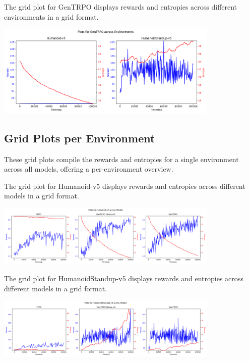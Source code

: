 \documentclass{svproc}
\begin{document}
The grid plot for GenTRPO displays rewards and entropies across different environments in a grid format.

\begin{center}
\includegraphics[width=0.8\textwidth]{grid_model_gentrpo-ne.png}
\end{center}

\subsection{Grid Plots per Environment}
These grid plots compile the rewards and entropies for a single environment across all models, offering a per-environment overview.

The grid plot for Humanoid-v5 displays rewards and entropies across different models in a grid format.

\begin{center}
\includegraphics[width=0.8\textwidth]{grid_env_Humanoid-v5.png}
\end{center}

The grid plot for HumanoidStandup-v5 displays rewards and entropies across different models in a grid format.

\begin{center}
\includegraphics[width=0.8\textwidth]{grid_env_HumanoidStandup-v5.png}
\end{center}
\end{document}
